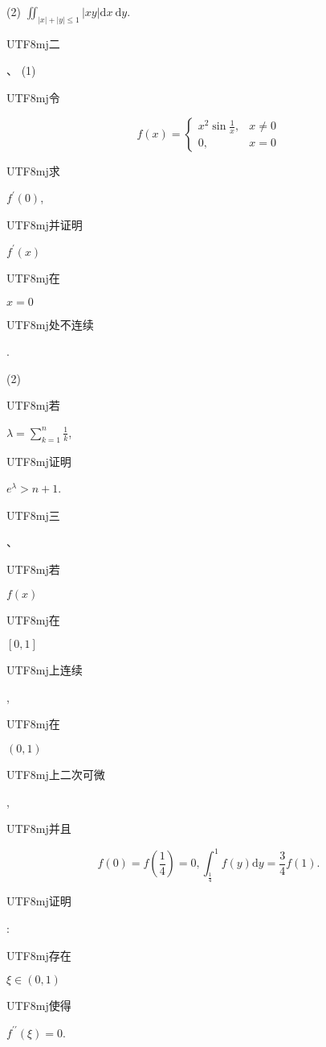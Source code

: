 \documentclass[10pt]{article}
\begin{document}
(2) $\iint_{|x|+|y| \leq 1}|x y| \mathrm{d} x \mathrm{~d} y$.

\begin{CJK}{UTF8}{mj}二\end{CJK}、 (1) \begin{CJK}{UTF8}{mj}令\end{CJK}
$$
f(x)= \begin{cases}x^{2} \sin \frac{1}{x}, & x \neq 0 \\ 0, & x=0\end{cases}
$$
\begin{CJK}{UTF8}{mj}求\end{CJK} $f^{\prime}(0)$, \begin{CJK}{UTF8}{mj}并证明\end{CJK} $f^{\prime}(x)$ \begin{CJK}{UTF8}{mj}在\end{CJK} $x=0$ \begin{CJK}{UTF8}{mj}处不连续\end{CJK}.

(2) \begin{CJK}{UTF8}{mj}若\end{CJK} $\lambda=\sum_{k=1}^{n} \frac{1}{k}$, \begin{CJK}{UTF8}{mj}证明\end{CJK} $e^{\lambda}>n+1$.

\begin{CJK}{UTF8}{mj}三\end{CJK}、\begin{CJK}{UTF8}{mj}若\end{CJK} $f(x)$ \begin{CJK}{UTF8}{mj}在\end{CJK} $[0,1]$ \begin{CJK}{UTF8}{mj}上连续\end{CJK}, \begin{CJK}{UTF8}{mj}在\end{CJK} $(0,1)$ \begin{CJK}{UTF8}{mj}上二次可微\end{CJK}, \begin{CJK}{UTF8}{mj}并且\end{CJK}
$$
f(0)=f\left(\frac{1}{4}\right)=0, \int_{\frac{1}{4}}^{1} f(y) \mathrm{d} y=\frac{3}{4} f(1) .
$$
\begin{CJK}{UTF8}{mj}证明\end{CJK}: \begin{CJK}{UTF8}{mj}存在\end{CJK} $\xi \in(0,1)$ \begin{CJK}{UTF8}{mj}使得\end{CJK} $f^{\prime \prime}(\xi)=0$.
\end{document}
